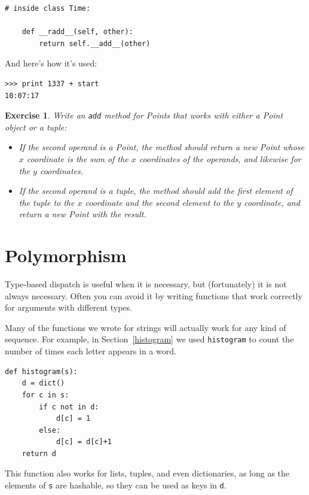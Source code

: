 \documentclass[12pt,a4paper,final,twoside,onecolumn,titlepage]{book}
\newtheorem{exercise}{Exercise}[chapter]
\begin{document}
\begin{verbatim}
# inside class Time:

    def __radd__(self, other):
        return self.__add__(other)
\end{verbatim}
%
And here's how it's used:

\begin{verbatim}
>>> print 1337 + start
10:07:17
\end{verbatim}
%

\begin{exercise}

Write an {\tt add} method for Points that works with either a
Point object or a tuple:  

\begin{itemize}

\item If the second operand is a Point, the method should return a new
Point whose $x$ coordinate is the sum of the $x$ coordinates of the
operands, and likewise for the $y$ coordinates.

\item If the second operand is a tuple, the method should add the
first element of the tuple to the $x$ coordinate and the second
element to the $y$ coordinate, and return a new Point with the result. 

\end{itemize}

\end{exercise}

\section{Polymorphism}

Type-based dispatch is useful when it is necessary, but (fortunately)
it is not always necessary.  Often you can avoid it by writing functions
that work correctly for arguments with different types.

Many of the functions we wrote for strings will actually
work for any kind of sequence.
For example, in Section~\ref{histogram}
we used {\tt histogram} to count the number of times each letter
appears in a word.

\begin{verbatim}
def histogram(s):
    d = dict()
    for c in s:
        if c not in d:
            d[c] = 1
        else:
            d[c] = d[c]+1
    return d
\end{verbatim}
%
This function also works for lists, tuples, and even dictionaries,
as long as the elements of {\tt s} are hashable, so they can be used
as keys in {\tt d}.
\end{document}
